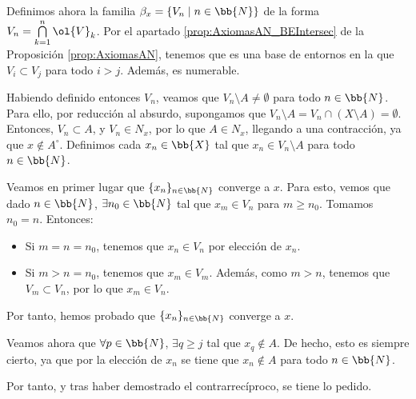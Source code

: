 \begin{ejercicio}
\begin{enumerate}[label=\alph*)]
        Definimos ahora la familia $\beta_x=\{V_n \mid n\in \bb{N}\}$ de la forma $V_n=\bigcap\limits_{k=1}^n \ol{V}_k$. Por el apartado \ref{prop:AxiomasAN_BEIntersec} de la Proposición \ref{prop:AxiomasAN}, tenemos que es una base de entornos en la que $V_i\subset V_j$ para todo $i>j$. Además, es numerable.

        Habiendo definido entonces $V_n$, veamos que $V_n\setminus A\neq \emptyset$ para todo $n\in \bb{N}$. Para  ello, por reducción al absurdo, supongamos que $V_n\setminus A = V_n\cap (X\setminus A) = \emptyset$. Entonces, $V_n\subset A$, y $V_n\in N_x$, por lo que $A\in N_x$, llegando a una contracción, ya que $x\notin A^\circ$. Definimos cada $x_n\in \bb{X}$ tal que $x_n\in V_n\setminus A$ para todo $n\in \bb{N}$.

        Veamos en primer lugar que $\{x_n\}_{n\in \bb{N}}$ converge a $x$. Para esto, vemos que dado $n\in \bb{N}$, $\exists n_0\in \bb{N}$ tal que $x_m\in V_n$ para $m\geq n_0$. Tomamos $n_0=n$. Entonces:
        \begin{itemize}
            \item Si $m=n=n_0$, tenemos que $x_n\in V_n$ por elección de $x_n$.
            \item Si $m>n=n_0$, tenemos que $x_m\in V_m$. Además, como $m>n$, tenemos que $V_m\subset V_n$, por lo que $x_m\in V_n$.
        \end{itemize}
        Por tanto, hemos probado que $\{x_n\}_{n\in \bb{N}}$ converge a $x$.

        Veamos ahora que $\forall p\in \bb{N}$, $\exists q\geq j$ tal que $x_q\notin A$. De hecho, esto es siempre cierto, ya que por la elección de $x_n$ se tiene que $x_n\notin A$ para todo $n\in \bb{N}$.

        Por tanto, y tras haber demostrado el contrarrecíproco, se tiene lo pedido.
    \end{enumerate}
\end{ejercicio}




